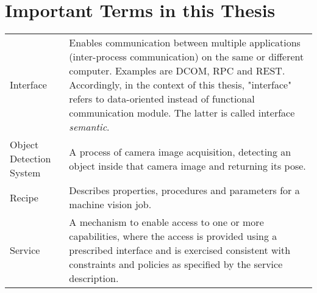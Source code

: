 \chapter*{Important Terms in this Thesis}

\extrarowsep=0.6cm\begin{tabu} to \linewidth{lX}
    Interface & Enables communication between multiple applications (inter-process communication) on the same or different computer. Examples are DCOM, RPC and REST. Accordingly, in the context of this thesis, "interface" refers to data-oriented instead of functional communication module. The latter is called interface \textit{semantic}.\\ 
    Object Detection System & A process of camera image acquisition, detecting an object inside that camera image and returning its pose.\\
    Recipe &  	Describes properties, procedures and parameters for a machine vision job. \cite{VDMA2018OPC40100-1:2018-11}	 \\ 
    Service & A mechanism to enable access to one or more capabilities, where the access is provided using a prescribed interface and is exercised consistent with constraints and policies as specified by the service description. \cite{MacKenzie2006ReferenceStandard}
\end{tabu}
\endinput